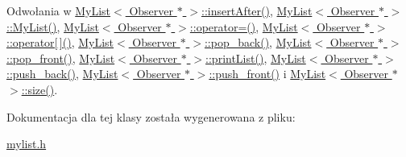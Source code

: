 Odwołania w \hyperlink{mylist_8h_source_l00212}{My\-List$<$ Observer $\ast$ $>$\-::insert\-After()}, \hyperlink{mylist_8h_source_l00039}{My\-List$<$ Observer $\ast$ $>$\-::\-My\-List()}, \hyperlink{mylist_8h_source_l00234}{My\-List$<$ Observer $\ast$ $>$\-::operator=()}, \hyperlink{mylist_8h_source_l00171}{My\-List$<$ Observer $\ast$ $>$\-::operator\mbox{[}$\,$\mbox{]}()}, \hyperlink{mylist_8h_source_l00084}{My\-List$<$ Observer $\ast$ $>$\-::pop\-\_\-back()}, \hyperlink{mylist_8h_source_l00098}{My\-List$<$ Observer $\ast$ $>$\-::pop\-\_\-front()}, \hyperlink{mylist_8h_source_l00156}{My\-List$<$ Observer $\ast$ $>$\-::print\-List()}, \hyperlink{mylist_8h_source_l00112}{My\-List$<$ Observer $\ast$ $>$\-::push\-\_\-back()}, \hyperlink{mylist_8h_source_l00125}{My\-List$<$ Observer $\ast$ $>$\-::push\-\_\-front()} i \hyperlink{mylist_8h_source_l00066}{My\-List$<$ Observer $\ast$ $>$\-::size()}.



Dokumentacja dla tej klasy została wygenerowana z pliku\-:\begin{DoxyCompactItemize}
\item 
\hyperlink{mylist_8h}{mylist.\-h}\end{DoxyCompactItemize}
